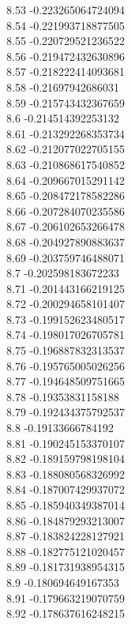 {8.53	-0.223265064724094\\
8.54	-0.221993718877505\\
8.55	-0.220729521236522\\
8.56	-0.219472432630896\\
8.57	-0.218222414093681\\
8.58	-0.21697942686031\\
8.59	-0.215743432367659\\
8.6	-0.214514392253132\\
8.61	-0.213292268353734\\
8.62	-0.212077022705155\\
8.63	-0.210868617540852\\
8.64	-0.209667015291142\\
8.65	-0.208472178582286\\
8.66	-0.207284070235586\\
8.67	-0.206102653266478\\
8.68	-0.204927890883637\\
8.69	-0.203759746488071\\
8.7	-0.202598183672233\\
8.71	-0.201443166219125\\
8.72	-0.200294658101407\\
8.73	-0.199152623480517\\
8.74	-0.198017026705781\\
8.75	-0.196887832313537\\
8.76	-0.195765005026256\\
8.77	-0.194648509751665\\
8.78	-0.19353831158188\\
8.79	-0.192434375792537\\
8.8	-0.19133666784192\\
8.81	-0.190245153370107\\
8.82	-0.189159798198104\\
8.83	-0.188080568326992\\
8.84	-0.187007429937072\\
8.85	-0.185940349387014\\
8.86	-0.184879293213007\\
8.87	-0.183824228127921\\
8.88	-0.182775121020457\\
8.89	-0.181731938954315\\
8.9	-0.180694649167353\\
8.91	-0.179663219070759\\
8.92	-0.178637616248215\\
}
